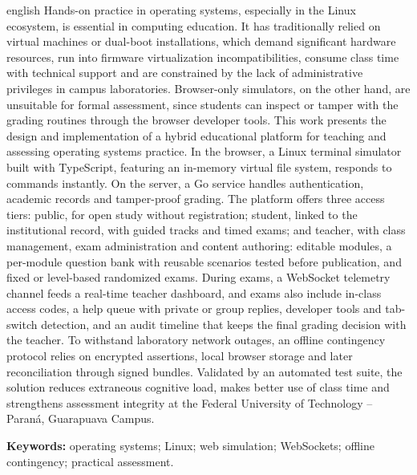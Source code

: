 \setlength{\absparsep}{18pt}
\begin{resumo}[Abstract]
\begin{otherlanguage*}{english}
\OnehalfSpacing
Hands-on practice in operating systems, especially in the Linux ecosystem, is essential in computing education. It has traditionally relied on virtual machines or dual-boot installations, which demand significant hardware resources, run into firmware virtualization incompatibilities, consume class time with technical support and are constrained by the lack of administrative privileges in campus laboratories. Browser-only simulators, on the other hand, are unsuitable for formal assessment, since students can inspect or tamper with the grading routines through the browser developer tools. This work presents the design and implementation of a hybrid educational platform for teaching and assessing operating systems practice. In the browser, a Linux terminal simulator built with TypeScript, featuring an in-memory virtual file system, responds to commands instantly. On the server, a Go service handles authentication, academic records and tamper-proof grading. The platform offers three access tiers: public, for open study without registration; student, linked to the institutional record, with guided tracks and timed exams; and teacher, with class management, exam administration and content authoring: editable modules, a per-module question bank with reusable scenarios tested before publication, and fixed or level-based randomized exams. During exams, a WebSocket telemetry channel feeds a real-time teacher dashboard, and exams also include in-class access codes, a help queue with private or group replies, developer tools and tab-switch detection, and an audit timeline that keeps the final grading decision with the teacher. To withstand laboratory network outages, an offline contingency protocol relies on encrypted assertions, local browser storage and later reconciliation through signed bundles. Validated by an automated test suite, the solution reduces extraneous cognitive load, makes better use of class time and strengthens assessment integrity at the Federal University of Technology -- Paraná, Guarapuava Campus.

\vspace{\onelineskip}
\noindent\textbf{Keywords:} operating systems; Linux; web simulation; WebSockets; offline contingency; practical assessment.
\end{otherlanguage*}
\end{resumo}
